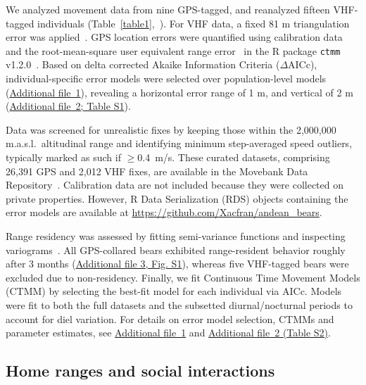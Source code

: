 \documentclass[lineno,referee,pdflatex,sn-vancouver-num]{sn-jnl}%
\theoremstyle{thmstyleone}%
\theoremstyle{thmstyletwo}%
\theoremstyle{thmstylethree}%
\begin{document}
We analyzed movement data from nine GPS-tagged, and reanalyzed fifteen VHF-tagged individuals (Table~\ref{table1},~\cite{castellanosAndeanBearHome2011}). For VHF data, a fixed 81 m triangulation error was applied~\cite{castellanosAndeanBearHome2011}. GPS location errors were quantified using calibration data and the root-mean-square user equivalent range error~\cite{flemingComprehensiveFrameworkHandling2020} in the R package \texttt{ctmm} v1.2.0~\cite{calabreseCtmmPackageAnalyzing2016}. Based on delta corrected Akaike Information Criteria ($\Delta$AICc), individual-specific error models were selected over population-level models (\hyperref[S1_File]{Additional file~1}), revealing a horizontal error range of 1 m, and vertical of 2 m (\hyperref[S1_File]{Additional file~2; Table S1}).

Data was screened for unrealistic fixes by keeping those within the 2,000,000 m.a.s.l.\ altitudinal range and identifying minimum step-averaged speed outliers, typically marked as such if $\geq$0.4~m/s.
These curated datasets, comprising 26,391 GPS and 2,012 VHF fixes, are available in the Movebank Data Repository~\cite{castellanosDataDawnDens2026}. Calibration data are not included because they were collected on private properties.
However, R Data Serialization (RDS) objects containing the error models are available at \url{https://github.com/Xacfran/andean_bears}.

Range residency was assessed by fitting semi-variance functions and inspecting variograms~\cite{flemingFineScaleForagingHome2014}. All GPS-collared bears exhibited range-resident behavior roughly after 3 months (\hyperref[S3_File]{Additional file 3, Fig. S1}), whereas five VHF-tagged bears were excluded due to non-residency. Finally, we fit Continuous Time Movement Models (CTMM) by selecting the best-fit model for each individual via AICc. Models were fit to both the full datasets and the subsetted diurnal/nocturnal periods to account for diel variation. For details on error model selection, CTMMs and parameter estimates, see \hyperref[S1_File]{Additional file~1} and \hyperref[S2_File]{Additional file~2 (Table S2)}.

\subsection{Home ranges and social interactions}
\end{document}
